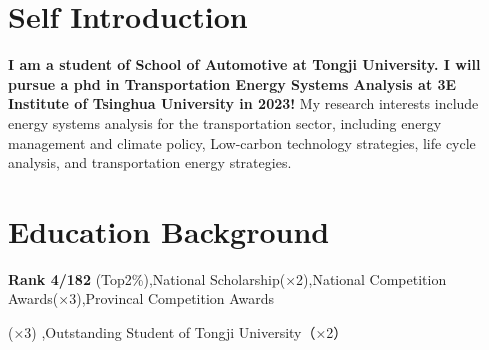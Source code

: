 \documentclass{resume}
\begin{document}


 
\section{Self Introduction}
\textbf{I am a student of School of Automotive at Tongji University. I will pursue a phd in Transportation Energy Systems Analysis at 3E Institute of Tsinghua University in 2023!} My research interests include energy systems analysis for the transportation sector, including energy management and climate policy, Low-carbon technology strategies, life cycle analysis, and transportation energy strategies.


\section{Education Background}

\textbf{Rank 4/182 }(Top2\%),National Scholarship(×2),National Competition Awards(×3),Provincal Competition Awards  \par(×3)  ,Outstanding Student of Tongji University（×2）



\end{document}
